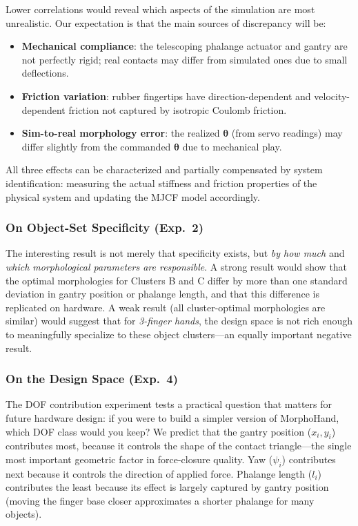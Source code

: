 \documentclass[journal]{IEEEtran}
\newcommand{\btheta}{\boldsymbol{\theta}}
\begin{document}
Lower correlations would reveal which aspects of the simulation are most unrealistic.
Our expectation is that the main sources of discrepancy will be:
\begin{itemize}
  \item \textbf{Mechanical compliance}: the telescoping phalange actuator and gantry
    are not perfectly rigid; real contacts may differ from simulated ones due to small
    deflections.
  \item \textbf{Friction variation}: rubber fingertips have direction-dependent and
    velocity-dependent friction not captured by isotropic Coulomb friction.
  \item \textbf{Sim-to-real morphology error}: the realized $\btheta$ (from servo readings)
    may differ slightly from the commanded $\btheta$ due to mechanical play.
\end{itemize}
All three effects can be characterized and partially compensated by system identification:
measuring the actual stiffness and friction properties of the physical system and
updating the MJCF model accordingly.

\subsubsection{On Object-Set Specificity (Exp.\ 2)}

The interesting result is not merely that specificity exists, but \emph{by how much} and
\emph{which morphological parameters are responsible}.
A strong result would show that the optimal morphologies for Clusters B and C differ by
more than one standard deviation in gantry position or phalange length, and that this
difference is replicated on hardware.
A weak result (all cluster-optimal morphologies are similar) would suggest that for
\emph{3-finger hands}, the design space is not rich enough to meaningfully specialize to
these object clusters---an equally important negative result.

\subsubsection{On the Design Space (Exp.\ 4)}

The DOF contribution experiment tests a practical question that matters for future hardware
design: if you were to build a simpler version of MorphoHand, which DOF class would you
keep?
We predict that the gantry position ($x_i, y_i$) contributes most, because it controls
the shape of the contact triangle---the single most important geometric factor in
force-closure quality.
Yaw ($\psi_i$) contributes next because it controls the direction of applied force.
Phalange length ($l_i$) contributes the least because its effect is largely captured by
gantry position (moving the finger base closer approximates a shorter phalange for many
objects).
\end{document}
